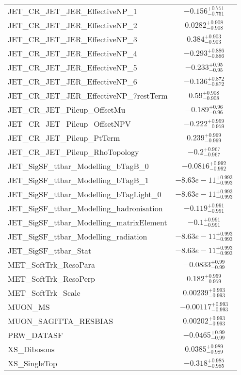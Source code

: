 \begin{tabular}{|l|c|}
JET\_CR\_JET\_JER\_EffectiveNP\_1 & $-0.156^{+0.751}_{-0.751}$ \\
JET\_CR\_JET\_JER\_EffectiveNP\_2 & $0.0282^{+0.908}_{-0.908}$ \\
JET\_CR\_JET\_JER\_EffectiveNP\_3 & $0.384^{+0.903}_{-0.903}$ \\
JET\_CR\_JET\_JER\_EffectiveNP\_4 & $-0.293^{+0.886}_{-0.886}$ \\
JET\_CR\_JET\_JER\_EffectiveNP\_5 & $-0.233^{+0.95}_{-0.95}$ \\
JET\_CR\_JET\_JER\_EffectiveNP\_6 & $-0.136^{+0.872}_{-0.872}$ \\
JET\_CR\_JET\_JER\_EffectiveNP\_7restTerm & $0.59^{+0.908}_{-0.908}$ \\
JET\_CR\_JET\_Pileup\_OffsetMu & $-0.189^{+0.96}_{-0.96}$ \\
JET\_CR\_JET\_Pileup\_OffsetNPV & $-0.222^{+0.959}_{-0.959}$ \\
JET\_CR\_JET\_Pileup\_PtTerm & $0.239^{+0.969}_{-0.969}$ \\
JET\_CR\_JET\_Pileup\_RhoTopology & $-0.2^{+0.967}_{-0.967}$ \\
JET\_SigSF\_ttbar\_Modelling\_bTagB\_0 & $-0.0816^{+0.992}_{-0.992}$ \\
JET\_SigSF\_ttbar\_Modelling\_bTagB\_1 & $-8.63e-11^{+0.993}_{-0.993}$ \\
JET\_SigSF\_ttbar\_Modelling\_bTagLight\_0 & $-8.63e-11^{+0.993}_{-0.993}$ \\
JET\_SigSF\_ttbar\_Modelling\_hadronisation & $-0.119^{+0.991}_{-0.991}$ \\
JET\_SigSF\_ttbar\_Modelling\_matrixElement & $-0.1^{+0.991}_{-0.991}$ \\
JET\_SigSF\_ttbar\_Modelling\_radiation & $-8.63e-11^{+0.993}_{-0.993}$ \\
JET\_SigSF\_ttbar\_Stat & $-8.63e-11^{+0.993}_{-0.993}$ \\
MET\_SoftTrk\_ResoPara & $-0.0833^{+0.99}_{-0.99}$ \\
MET\_SoftTrk\_ResoPerp & $0.182^{+0.959}_{-0.959}$ \\
MET\_SoftTrk\_Scale & $0.00239^{+0.993}_{-0.993}$ \\
MUON\_MS & $-0.00117^{+0.993}_{-0.993}$ \\
MUON\_SAGITTA\_RESBIAS & $0.00202^{+0.993}_{-0.993}$ \\
PRW\_DATASF & $-0.0465^{+0.99}_{-0.99}$ \\
XS\_Dibosons & $0.0385^{+0.989}_{-0.989}$ \\
XS\_SingleTop & $-0.318^{+0.985}_{-0.985}$ \\

\end{tabular}
